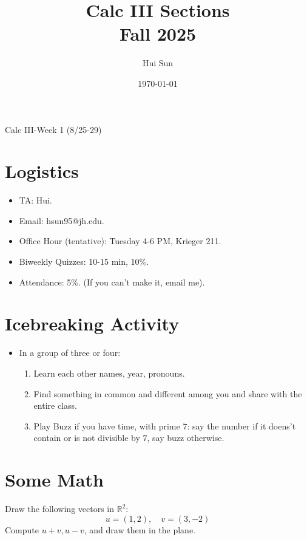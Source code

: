 \documentclass[openany]{book}
\title{Calc III Sections
\\ 
\vspace{0.4cm}
\large Fall 2025}
\date{\today}
\author{Hui Sun}
\newcommand{\R}{\mathbb{R}}
\begin{document}
\maketitle

\newpage


\begin{center}
    \Large Calc III-Week 1 (8/25-29)
\end{center}

\renewcommand\thesection{\arabic{section}}

\section{Logistics}


\begin{itemize}
    \item TA: Hui.
    \item Email: hsun95@jh.edu.
    \item Office Hour (tentative): Tuesday 4-6 PM, Krieger 211.
    \item Biweekly Quizzes: 10-15 min, 10\%.
    \item Attendance: 5\%. (If you can't make it, email me).
\end{itemize}

\section{Icebreaking Activity}

\begin{itemize}
    \item In a group of three or four: 
    \begin{enumerate}
        \item Learn each other names, year, pronouns.
        \item Find something in common and different among you and share with the entire class.
        \item Play Buzz if you have time, with prime $7$: say the number if it doens't contain or is not divisible by $7$, say buzz otherwise.
    \end{enumerate}
\end{itemize}


\section{Some Math}
\begin{prob}
    Draw the following vectors in $\R^2$:
    \begin{equation*}
        u=(1,2), \quad v=(3,-2)
    \end{equation*}
    Compute $u+v, u-v$, and draw them in the plane.
\end{prob}
\end{document}
